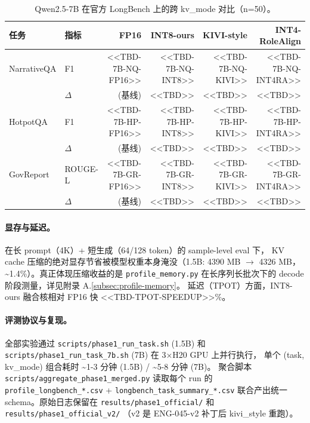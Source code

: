 \begin{table}[!htbp]
\centering
\caption{Qwen2.5-7B 在官方 LongBench 上的跨 kv\_mode 对比（n=50）。}
\label{tab:phase1-official-longbench-7b}
\begin{tabular}{llrrrr}
\toprule
任务 & 指标 & FP16 & INT8-ours & KIVI-style & INT4-RoleAlign \\
\midrule
NarrativeQA & F1 & <<TBD-7B-NQ-FP16>> & <<TBD-7B-NQ-INT8>> & <<TBD-7B-NQ-KIVI>> & <<TBD-7B-NQ-INT4RA>> \\
            & $\Delta$ & (基线) & <<TBD>> & <<TBD>> & <<TBD>> \\
HotpotQA    & F1 & <<TBD-7B-HP-FP16>> & <<TBD-7B-HP-INT8>> & <<TBD-7B-HP-KIVI>> & <<TBD-7B-HP-INT4RA>> \\
            & $\Delta$ & (基线) & <<TBD>> & <<TBD>> & <<TBD>> \\
GovReport   & ROUGE-L & <<TBD-7B-GR-FP16>> & <<TBD-7B-GR-INT8>> & <<TBD-7B-GR-KIVI>> & <<TBD-7B-GR-INT4RA>> \\
            & $\Delta$ & (基线) & <<TBD>> & <<TBD>> & <<TBD>> \\
\bottomrule
\end{tabular}
\end{table}

\paragraph{显存与延迟。}
在长 prompt（4K）+ 短生成（64/128 token）的 sample-level eval 下，
KV cache 压缩的绝对显存节省被模型权重本身淹没（1.5B: 4390 MB $\rightarrow$ 4326 MB，
\textasciitilde 1.4\%）。真正体现压缩收益的是 \texttt{profile\_memory.py}
在长序列长批次下的 decode 阶段测量，详见附录 A.\ref{subsec:profile-memory}。
延迟（TPOT）方面，INT8-ours 融合核相对 FP16 快 <<TBD-TPOT-SPEEDUP>>\%。

\paragraph{评测协议与复现。}
全部实验通过 \texttt{scripts/phase1\_run\_task.sh} (1.5B) 和
\texttt{scripts/phase1\_run\_task\_7b.sh} (7B) 在 3×H20 GPU 上并行执行，
单个 (task, kv\_mode) 组合耗时 \textasciitilde1-3 分钟 (1.5B) / \textasciitilde5-8 分钟 (7B)。
聚合脚本 \texttt{scripts/aggregate\_phase1\_merged.py} 读取每个 run 的
\texttt{profile\_longbench\_*.csv} + \texttt{longbench\_task\_summary\_*.csv}
联合产出统一 schema。原始日志保留在
\texttt{results/phase1\_official/} 和 \texttt{results/phase1\_official\_v2/}
（v2 是 ENG-045-v2 补丁后 kivi\_style 重跑）。
